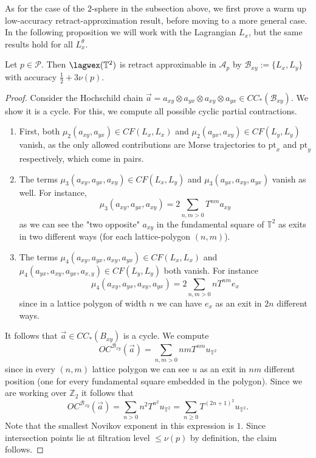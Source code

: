 As for the case of the $2$-sphere in the subsection above, we first prove a warm up low-accuracy retract-approximation result, before moving to a more general case. In the following proposition we will work with the Lagrangian $L_x$, but the same results hold for all $L_x^\theta$.
\begin{prop}
	Let $p\in \mathcal{P}$. Then $\lagwex(\mathbb{T}^2)$ is retract approximable in $\mathcal{A}_p$ by $\mathcal{B}_{xy}:=\{L_x,L_y\}$ with accuracy $\frac{1}{2}+3\nu(p)$.
\end{prop}
\begin{proof}
	Consider the Hochschild chain $\vec{a}=a_{xy}\otimes a_{yx}\otimes a_{xy}\otimes a_{yx}\in CC_*(\mathcal{B}_{xy})$. We show it is a cycle. For this, we compute all possible cyclic partial contractions.
	\begin{enumerate}
		\item First, both $\mu_2(a_{xy},a_{yx})\in CF(L_x,L_x)$ and $\mu_2(a_{yx},a_{xy})\in CF(L_y,L_y)$ vanish, as the only allowed contributions are Morse trajectories to $\text{pt}_x$ and $\text{pt}_y$ respectively, which come in pairs.
		\item The terms $\mu_3(a_{xy},a_{yx},a_{xy})\in CF(L_x,L_y)$ and $\mu_3(a_{yx},a_{xy},a_{yx})$ vanish as well. For instance, $$\mu_3(a_{xy},a_{yx},a_{xy}) = 2\sum_{n,m>0}T^{nm}a_{xy}$$ as we can see the "two opposite" $a_{xy}$ in the fundamental square of $\mathbb{T}^2$ as exits in two different ways (for each lattice-polygon $(n,m)$).
		\item The terms $\mu_4(a_{xy},a_{yx},a_{xy},a_{yx})\in CF(L_x,L_x)$ and $\mu_4(a_{yx},a_{xy},a_{yx},a_{x,y})\in CF(L_y,L_y)$ both vanish. For instance $$\mu_4(a_{xy},a_{yx},a_{xy},a_{yx})=2\sum_{n,m>0}nT^{nm}e_x$$ since in a lattice polygon of width $n$ we can have $e_x$ as an exit in $2n$ different ways.
	\end{enumerate}
	It follows that $\vec{a}\in CC_*(B_{xy})$ is a cycle. We compute $$OC^{\mathcal{B}_{xy}}(\vec{a}) = \sum_{n,m>0}nmT^{nm}u_{\mathbb{T}^2}$$ since in every $(n,m)$ lattice polygon we can see $u$ as an exit in $nm$ different position (one for every fundamental square embedded in the polygon). Since we are working over $\mathbb{Z}_2$ it follows that $$OC^{\mathcal{B}_{xy}}(\vec{a}) = \sum_{n>0}n^2T^{n^2}u_{\mathbb{T}^2} =  \sum_{n\geq0}T^{(2n+1)^2}u_{\mathbb{T}^2}.$$ Note that the smallest Novikov exponent in this expression is $1$. Since intersection points lie at filtration level $\leq \nu(p)$ by definition, the claim follows.
\end{proof}
